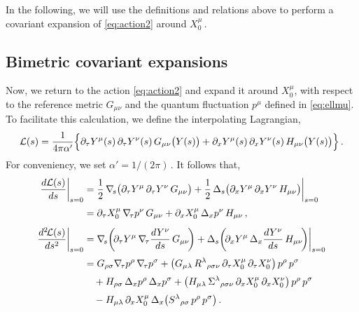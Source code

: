\documentclass[11pt]{article}
\newcommand{\be}{\begin{equation}}
\newcommand{\ee}{\end{equation}}
\newcommand{\CL}{\mathcal{L}}
\newcommand{\p}{\partial}
\begin{document}
In the following, we will use the definitions and relations above to perform a covariant expansion of \eqref{eq:action2} around $X_0^\mu$\,.

\subsection{Bimetric covariant expansions}

Now, we return to the action \eqref{eq:action2} and expand it around $X_0^\mu$, with respect to the reference metric $G_{\mu\nu}$ and the quantum fluctuation $p^\mu$ defined in \eqref{eq:ellmu}. To facilitate this calculation, we define the interpolating Lagrangian,
%
\be
	\CL (s) = \frac{1}{4\pi\alpha'} \Bigl\{ \p_\tau Y^\mu (s) \, \p_\tau Y^\nu (s) \, G_{\mu\nu} \bigl(Y(s)\bigr) + \p_x Y^\mu (s) \, \p_x Y^\nu (s) \, H_{\mu\nu} \bigl(Y(s)\bigr) \Bigr \}\,.
\ee
%
For conveniency, we set $\alpha' = 1 / (2 \pi)$\,. It follows that,
%
\begin{subequations}
\begin{align}
	\frac{d \CL(s)}{ds} \bigg|_{s=0} & = \frac{1}{2} \, \nabla_{\!s} \bigl( \p_\tau Y^\mu \, \p_\tau Y^\nu \, G_{\mu\nu} \bigr) + \frac{1}{2} \, \Delta_s \bigl( \p_x Y^\mu \, \p_x Y^\nu \, H_{\mu\nu} \bigr) \bigg|_{s=0} \notag \\[2pt]
		& = \p_\tau X_0^\mu \, \nabla_{\!\tau} p^\nu \, G_{\mu\nu} + \p_x X^\mu_0 \, \Delta_{x} p^\nu \, H_{\mu\nu}\,, \\[4pt]
	\frac{d^2 \! \CL (s)}{d s^2} \bigg|_{s=0} & = \nabla_{\!s} \biggl( \! \p_\tau Y^\mu \, \nabla_{\!\tau} \frac{dY^\nu}{ds} \, G_{\mu\nu} \! \biggr) + \Delta_s \biggl( \! \p_x Y^\mu \, \Delta_{x} \frac{dY^\nu}{ds} \, H_{\mu\nu} \! \biggr) \bigg|_{s=0} \notag \\[2pt]
		& = G_{\rho\sigma} \nabla_{\!\tau} p^\rho \, \nabla_{\!\tau} p^\sigma + \bigl( G_{\mu\lambda} \, R^\lambda{}_{\rho\sigma\nu} \, \p_\tau X^\mu_0  \, \p_\tau X_0^\nu \bigr) \, p^\rho \, p^\sigma \notag \\[2pt]
		& \quad + H_{\rho\sigma} \, \Delta_x p^\rho \, \Delta_x p^\sigma + \bigl( H_{\mu\lambda} \, \Sigma^\lambda{}_{\rho\sigma\nu} \, \p_x X^\mu_0  \, \p_x X_0^\nu \bigr) \, p^\rho \, p^\sigma \notag \\[2pt]
		& \quad - H_{\mu\lambda} \, \p_x X_0^\mu \, \Delta_x \bigl( S^\lambda{}_{\rho\sigma} \, p^\rho \, p^\sigma \bigr) \,. 
\end{align}
\end{subequations}
\end{document}
